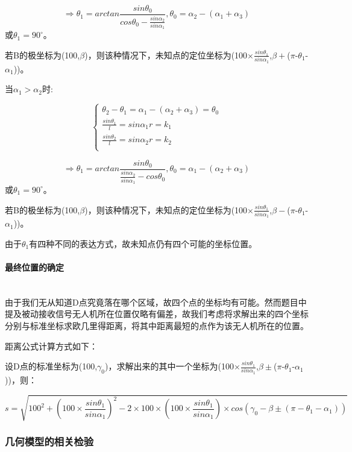 \documentclass{ctexart}
\newcommand{\subsubsubsection}[1]{\paragraph{#1}\mbox{}\\}
\begin{document}
\[
    \Rightarrow \theta_1=arctan\frac{sin\theta_0}{cos\theta_0-\frac{sin\alpha_2}{sin\alpha_1}},\theta_0=\alpha_2-(\alpha_1+\alpha_3)
\]
或$\theta_1=90^{\circ}$。

若B的极坐标为(100,$\beta$)，则该种情况下，未知点的定位坐标为(100$\times\frac{sin\theta_1}{sin\alpha_1}$,$\beta +$($\pi$-$\theta_1$-$\alpha_1$))。


当$\alpha_1 > \alpha_2$时:

\begin{equation}
    \left\{
              \begin{array}{ll}
                \theta_2-\theta_1=\alpha_1-(\alpha_2+\alpha_3)=\theta_0\\
                \frac{sin\theta_1}{l}={sin\alpha_1}{r}=k_1\\
                \frac{sin\theta_2}{l}={sin\alpha_2}{r}=k_2\\

              \end{array}
            \right.
\end{equation}

\[
    \Rightarrow \theta_1=arctan\frac{sin\theta_0}{\frac{sin\alpha_2}{sin\alpha_1}-cos\theta_0},\theta_0=\alpha_1-(\alpha_2+\alpha_3)
\]
或$\theta_1=90^{\circ}$。

若B的极坐标为(100,$\beta$)，则该种情况下，未知点的定位坐标为(100$\times\frac{sin\theta_1}{sin\alpha_1}$,$\beta -$($\pi$-$\theta_1$-$\alpha_1$))。

由于$\theta_1$有四种不同的表达方式，故未知点仍有四个可能的坐标位置。 

\subsubsubsection{最终位置的确定}

由于我们无从知道D点究竟落在哪个区域，故四个点的坐标均有可能。然而题目中提及被动接收信号无人机所在位置仅略有偏差，故我们考虑将求解出来的四个坐标分别与标准坐标求欧几里得距离，将其中距离最短的点作为该无人机所在的位置。

距离公式计算方式如下：

设D点的标准坐标为(100,$\gamma_0$)，求解出来的其中一个坐标为(100$\times\frac{sin\theta_1}{sin\alpha_1}$,$\beta \pm$($\pi$-$\theta_1$-$\alpha_1$))，则：

\[
 s=\sqrt{100^2+(100\times\frac{sin\theta_1}{sin\alpha_1})^2-2\times100\times(100\times\frac{sin\theta_1}{sin\alpha_1})\times cos(\gamma_0-\beta \pm(\pi-\theta_1-\alpha_1))}
\]

\subsubsection{几何模型的相关检验}
\end{document}
